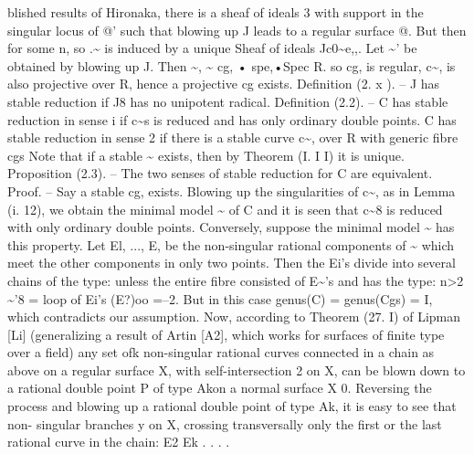 \documentclass[11pt]{article}
\theoremstyle{plain}
\theoremstyle{definition}
\theoremstyle{remark}
\begin{document}
blished results of Hironaka, there is a sheaf of ideals 3 with support in the singular locus of @' such that blowing up J leads to a regular surface @. But then for some n, so .\textasciitilde{} is induced by a unique Sheaf of ideals Jc0\textasciitilde{}e,,. Let \textasciitilde{}' be obtained by blowing up J. Then \textasciitilde{}, \textasciitilde{} cg, • spe,•Spec R. so cg, is regular, c\textasciitilde{}, is also projective over R, hence a projective cg exists. Definition (2. x ). -- J has stable reduction if J8 has no unipotent radical. Definition (2.2). -- C has stable reduction in sense i if c\textasciitilde{}s is reduced and has only ordinary double points. C has stable reduction in sense 2 if there is a stable curve c\textasciitilde{}, over R with generic fibre cgs Note that if a stable \textasciitilde{} exists, then by Theorem (I. I I) it is unique. Proposition (2.3). -- The two senses of stable reduction for C are equivalent. Proof. -- Say a stable cg, exists. Blowing up the singularities of c\textasciitilde{}, as in Lemma (i. 12), we obtain the minimal model \textasciitilde{} of C and it is seen that c\textasciitilde{}8 is reduced with only ordinary double points. Conversely, suppose the minimal model \textasciitilde{} has this property. Let El, ..., E, be the non-singular rational components of \textasciitilde{} which meet the other components in only two points. Then the Ei's divide into several chains of the type: unless the entire fibre consisted of E\textasciitilde{}'s and has the type: n>2 \textasciitilde{}'8 = loop of Ei's (E?)oo =--2. But in this case genus(C) = genus(Cgs) = I, which contradicts our assumption. Now, according to Theorem (27. I) of Lipman [Li] (generalizing a result of Artin [A2], which works for surfaces of finite type over a field) any set ofk non-singular rational curves connected in a chain as above on a regular surface X, with self-intersection 2 on X, can be blown down to a rational double point P of type Akon a normal surface X 0. Reversing the process and blowing up a rational double point of type Ak, it is easy to see that non- singular branches y on X, crossing transversally only the first or the last rational curve in the chain: E2 Ek . . . .
\end{document}
